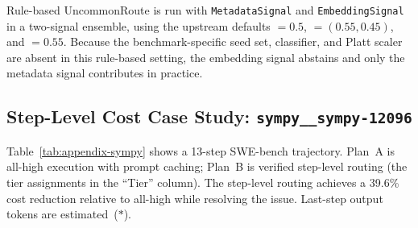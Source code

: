 Rule-based UncommonRoute is run with \texttt{MetadataSignal} and
\texttt{EmbeddingSignal} in a two-signal ensemble, using the upstream
defaults $=0.5$,
$=(0.55,0.45)$, and
$=0.55$. Because the benchmark-specific
seed set, classifier, and Platt scaler are absent in this rule-based
setting, the embedding signal abstains and only the metadata signal
contributes in practice.

\subsection{Step-Level Cost Case Study: \texttt{sympy\_\_sympy-12096}}
\label{app:sympy}

Table~\ref{tab:appendix-sympy} shows a 13-step SWE-bench trajectory.
Plan~A is all-high execution with prompt caching; Plan~B is verified step-level routing
(the tier assignments in the ``Tier'' column).
The step-level routing achieves a 39.6\% cost reduction relative to all-high while resolving the issue.
Last-step output tokens are estimated~($*$).

